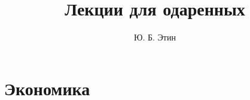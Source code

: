 \documentclass[a4paper,12pt]{book}
\begin{document}
\author{Ю. Б. Этин}
\title{Лекции для одаренных}

\frontmatter
\maketitle
\tableofcontents

\mainmatter
\chapter{Экономика}

%

\backmatter
\end{document}
